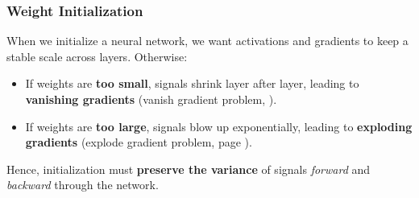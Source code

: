 \subsubsection{Weight Initialization}\label{sec:weight-initialization}

When we initialize a neural network, we want activations and gradients to keep a stable scale across layers. Otherwise:
\begin{itemize}
    \item If weights are \textbf{too small}, signals shrink layer after layer, leading to \textbf{vanishing gradients} (vanish gradient problem, ).
    \item If weights are \textbf{too large}, signals blow up exponentially, leading to \textbf{exploding gradients} (explode gradient problem, page ).
\end{itemize}
Hence, initialization must \textbf{preserve the variance} of signals \emph{forward} and \emph{backward} through the network.


